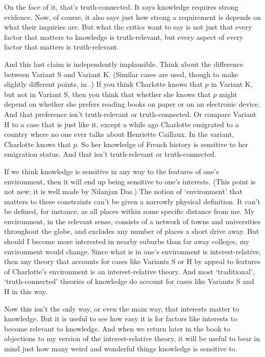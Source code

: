 \documentclass[11pt,]{book}
\begin{document}
On the face of it, that's truth-connected. It says knowledge requires strong evidence. Now, of course, it also says just how strong a requirement is depends on what their inquiries are. But what the critics want to say is not just that every factor that matters to knowledge is truth-relevant, but every aspect of every factor that matters is truth-relevant.

And this last claim is independently implausible. Think about the difference between Variant S and Variant K. (Similar cases are used, though to make slightly different points, in \citet{Gendler2005}.) If you think Charlotte knows that \(p\) in Variant K, but not in Variant S, then you think that whether she knows that \(p\) might depend on whether she prefers reading books on paper or on an electronic device. And that preference isn't truth-relevant or truth-connected. Or compare Variant H to a case that is just like it, except a while ago Charlotte emigrated to a country where no one ever talks about Henriette Caillaux. In the variant, Charlotte knows that \(p\). So her knowledge of French history is sensitive to her emigration status. And that isn't truth-relevant or truth-connected.

If we think knowledge is sensitive in any way to the features of one's environment, then it will end up being sensitive to one's interests. (This point is not new; it is well made by Nilanjan Das.) The notion of `environment' that matters to these constraints can't be given a narrowly physical definition. It can't be defined, for instance, as all places within some specific distance from me. My environment, in the relevant sense, consists of a network of towns and universities throughout the globe, and excludes any number of places a short drive away. But should I become more interested in nearby suburbs than far away colleges, my environment would change. Since what is in one's environment is interest-relative, then any theory that accounts for cases like Variants S or H by appeal to features of Charlotte's environment is an interest-relative theory. And most `traditional', `truth-connected' theories of knowledge do account for cases like Variants S and H in this way.

Now this isn't the only way, or even the main way, that interests matter to knowledge. But it is useful to see how easy it is for factors like interests to become relevant to knowledge. And when we return later in the book to objections to my version of the interest-relative theory, it will be useful to bear in mind just how many weird and wonderful things knowledge is sensitive to.
\end{document}
